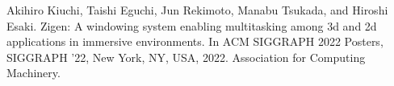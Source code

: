 \documentclass[master]{cimt}
\begin{document}
\maketitle

\frontmatter

\begin{jabstract}
  
\end{jabstract}

\begin{eabstract}
  
\end{eabstract}

\tableofcontents

\mainmatter







\backmatter

\begin{publications}
  \item Akihiro Kiuchi, Taishi Eguchi, Jun Rekimoto, Manabu Tsukada, and Hiroshi Esaki.
  Zigen: A windowing system enabling multitasking among 3d and 2d applications in immersive environments.
  In ACM SIGGRAPH 2022 Posters, SIGGRAPH ’22, New York, NY, USA, 2022. Association for Computing Machinery.
\end{publications}




\begin{acknowledgements}
  
\end{acknowledgements}


\end{document}
